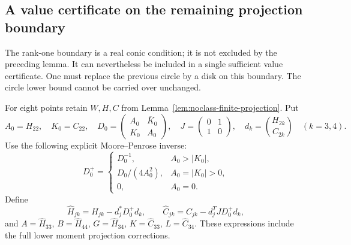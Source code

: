 \documentclass[11pt]{article}
\theoremstyle{remark}
\numberwithin{equation}{section}
\begin{document}
\subsection{A value certificate on the remaining projection boundary}

The rank-one boundary is a real conic condition; it is not excluded
by the preceding lemma. It can nevertheless be included in a
single sufficient value certificate. One must replace the previous
circle by a disk on this boundary. The circle lower bound cannot
be carried over unchanged.

For eight points retain $W,H,C$ from
Lemma~\ref{lem:noclass-finite-projection}. Put
\[
 A_0=H_{22},\quad K_0=C_{22},\quad
 D_0=\begin{pmatrix}A_0&\overline K_0\\K_0&A_0\end{pmatrix},
 \quad J=\begin{pmatrix}0&1\\1&0\end{pmatrix},\quad
 d_k=\binom{H_{2k}}{C_{2k}}\quad(k=3,4).
\]
Use the following explicit Moore--Penrose inverse:
\[
 D_0^+=
 \begin{cases}
 D_0^{-1},&A_0>|K_0|,\\
 D_0/(4A_0^2),&A_0=|K_0|>0,\\
 0,&A_0=0.
 \end{cases}
\]
Define
\[
 \widehat H_{jk}=H_{jk}-d_j^*D_0^+d_k,
 \qquad
 \widehat C_{jk}=C_{jk}-d_j^TJD_0^+d_k,
\]
and $A=\widehat H_{33}$, $B=\widehat H_{44}$,
$G=\widehat H_{34}$, $K=\widehat C_{33}$,
$L=\widehat C_{34}$. These expressions include the full lower
moment projection corrections.
\end{document}
